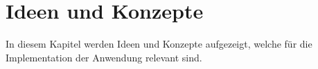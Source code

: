 \chapter{Ideen und Konzepte}
In diesem Kapitel werden Ideen und Konzepte aufgezeigt, welche für die Implementation der Anwendung relevant sind.




